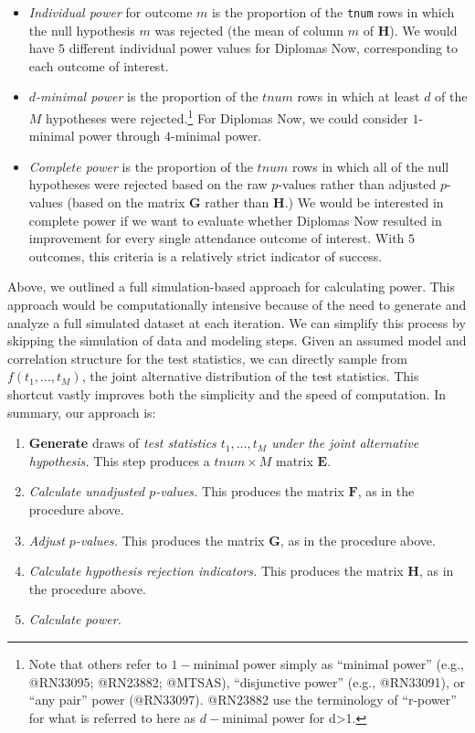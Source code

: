 \documentclass[
]{article}
\providecommand{\tightlist}{%
  \setlength{\itemsep}{0pt}\setlength{\parskip}{0pt}}
\begin{document}
\begin{itemize}
\item
  \emph{Individual power} for outcome \(m\) is the proportion of the
  \texttt{tnum} rows in which the null hypothesis \(m\) was rejected
  (the mean of column \(m\) of \(\mathbf{H}\)). We would have \(5\)
  different individual power values for Diplomas Now, corresponding to
  each outcome of interest.
\item
  \emph{\(d\)-minimal power} is the proportion of the \(tnum\) rows in
  which at least \(d\) of the \(M\) hypotheses were
  rejected.\footnote{Note that others refer to $1-$minimal power simply as “minimal power” (e.g., @RN33095; @RN23882; @MTSAS), “disjunctive power” (e.g., @RN33091), or “any pair” power (@RN33097). @RN23882 use the terminology of “r-power” for what is referred to here as $d-$minimal power for d>1.}
  For Diplomas Now, we could consider \(1\)-minimal power through
  \(4\)-minimal power.
\item
  \emph{Complete power} is the proportion of the \(tnum\) rows in which
  all of the null hypotheses were rejected based on the raw \(p\)-values
  rather than adjusted \(p\)-values (based on the matrix \(\mathbf{G}\)
  rather than \(\mathbf{H}\).) We would be interested in complete power
  if we want to evaluate whether Diplomas Now resulted in improvement
  for every single attendance outcome of interest. With \(5\) outcomes,
  this criteria is a relatively strict indicator of success.
\end{itemize}

Above, we outlined a full simulation-based approach for calculating
power. This approach would be computationally intensive because of the
need to generate and analyze a full simulated dataset at each iteration.
We can simplify this process by skipping the simulation of data and
modeling steps. Given an assumed model and correlation structure for the
test statistics, we can directly sample from \(f(t_1, \dots, t_M)\), the
joint alternative distribution of the test statistics. This shortcut
vastly improves both the simplicity and the speed of computation. In
summary, our approach is:

\begin{enumerate}
\def\labelenumi{\arabic{enumi}.}
\tightlist
\item
  \textbf{Generate} draws of \emph{test statistics \(t_1, \dots, t_M\)
  under the joint alternative hypothesis.} This step produces a
  \(tnum \times M\) matrix \(\mathbf{E}\).
\item
  \emph{Calculate unadjusted \(p\)-values.} This produces the matrix
  \(\mathbf{F}\), as in the procedure above.
\item
  \emph{Adjust \(p\)-values.} This produces the matrix \(\mathbf{G}\),
  as in the procedure above.
\item
  \emph{Calculate hypothesis rejection indicators.} This produces the
  matrix \(\mathbf{H}\), as in the procedure above.
\item
  \emph{Calculate power.}
\end{enumerate}
\end{document}
